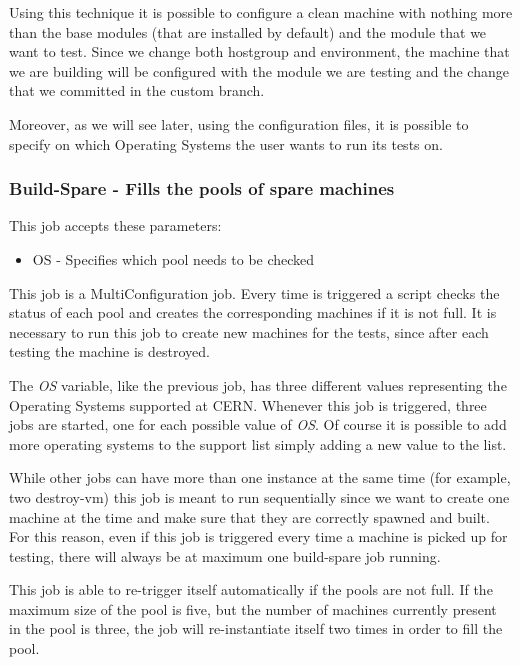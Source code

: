 Using this technique it is possible to configure a clean machine with
nothing more than the base modules (that are installed by default) and the
module that we want to test. Since we change both hostgroup and
environment, the machine that we are building will be configured with the
module we are testing and the change that we committed in the custom
branch.

Moreover, as we will see later, using the configuration files, it is
possible to specify on which Operating Systems the user wants to run its
tests on.

\subsubsection{Build-Spare - Fills the pools of spare machines}

This job accepts these parameters:

\begin{itemize}
  \item OS - Specifies which pool needs to be checked
\end{itemize}

This job is a MultiConfiguration job. Every time is triggered a script
checks the status of each pool and creates the corresponding machines if
it is not full. It is necessary to run this job to create new machines for
the tests, since after each testing the machine is destroyed.

The \textit{OS} variable, like the previous job, has three different
values representing the Operating Systems supported at CERN. Whenever this
job is triggered, three jobs are started, one for each possible value of
\textit{OS}. Of course it is possible to add more operating systems to the
support list simply adding a new value to the list.

While other jobs can have more than one instance at the same time (for
example, two destroy-vm) this job is meant to run sequentially since we
want to create one machine at the time and make sure that they are
correctly spawned and built. For this reason, even if this job is
triggered every time a machine is picked up for testing, there will always
be at maximum one build-spare job running.

This job is able to re-trigger itself automatically if the pools are not
full. If the maximum size of the pool is five, but the number of machines
currently present in the pool is three, the job will re-instantiate itself
two times in order to fill the pool.

